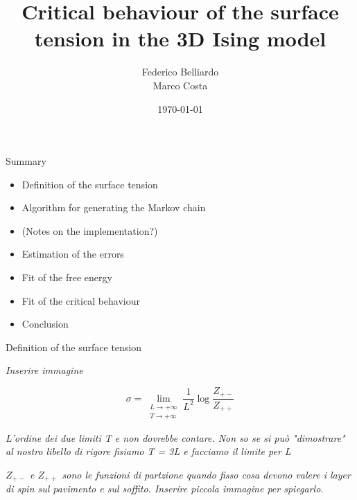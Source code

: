 \documentclass{beamer}
\title[]{Critical behaviour of the surface tension in the 3D Ising model} %
\author[]
{
Federico Belliardo \\
Marco Costa
}
\institute[] %
{
Dipartimento di Fisica\\ %
Università di Pisa \\
\medskip
}
\date{\today} %
\begin{document}
\begin{frame}
\titlepage %
\end{frame}



\begin{frame}{Summary}
\begin{center}

\begin{itemize}
\item Definition of the surface tension
\item Algorithm for generating the Markov chain
\item (Notes on the implementation?)
\item Estimation of the errors
\item Fit of the free energy
\item Fit of the critical behaviour
\item Conclusion
\end{itemize}

\end{center}
\end{frame}

\begin{frame}{Definition of the surface tension}
\begin{center}

\textit{Inserire immagine}

\[
\sigma = \lim_{\substack{L \rightarrow +\infty \\  T \rightarrow +\infty}} \frac{1}{L^2} \log \frac{Z_{+-}}{Z_{++}}
\]

\textit{L'ordine dei due limiti T e  non dovrebbe contare. Non so se si può "dimostrare" al nostro libello di rigore fisiamo T = 3L e facciamo il limite per L}

\textit{$Z_{+-}$ e $Z_{++}$ sono le funzioni di partzione quando fisso cosa devono valere i layer di spin sul pavimento e sul soffito. Inserire piccola immagine per spiegarlo.}

\end{center}
\end{frame}
\end{document}
